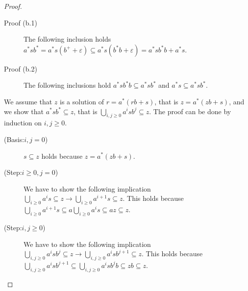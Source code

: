 \begin{theorem}
\begin{proof}
\begin{description}
			\begin{description}

				\item [Proof (b.1)] The following inclusion holds
				$a^{*}sb^{*}=a^{*}s(b^{+}+\varepsilon)\subseteq  a^{*}s(b^{*}b+\varepsilon)=a^{*}sb^{*}b+a^{*}s$.

				\item [Proof (b.2)] The following inclusions hold
				$a^{*}sb^{*}b\subseteq a^{*}sb^{*}$ and $a^{*}s\subseteq a^{*}sb^{*}$.

			\end{description}

			\item [Proof (c)] We assume that $z$ is a solution of $r=a^{*}(rb+s)$, that is $z=a^{*}(zb+s)$, and we show that $a^{*}sb^{*}\subseteq z$,
			that is $\bigcup_{i,j\geq0}a^{i}sb^{j}\subseteq z$. The proof can be done by induction on $i,j\geq0$.
			
			\begin{description}
				
				\item [(Basis:$i,j=0$)] $s\subseteq z$ holds because
				$z=a^{*}(zb+s)$.
				
				\item [(Step:$i\geq0,j=0$)] We have to show the following implication
				$\bigcup_{i\geq0}a^{i}s\subseteq z\rightarrow\bigcup_{i\geq0}a^{i+1}s\subseteq z$.
				This holds because $\bigcup_{i\geq0}a^{i+1}s\subseteq a\bigcup_{i\geq0}a^{i}s\subseteq az\subseteq z$.
				
				\item [(Step:$i,j\geq0$)] We have to show the following implication
				$\bigcup_{i,j\geq0}a^{i}sb^{j}\subseteq z\rightarrow\bigcup_{i,j\geq0}a^{i}sb^{j+1}\subseteq z$.
				This holds because $\bigcup_{i,j\geq0}a^{i}sb^{j+1}\subseteq\bigcup_{i,j\geq0}a^{i}sb^{j}b\subseteq zb\subseteq z$.
				
			\end{description}

		\end{description}		
	\end{proof}
\end{theorem}
